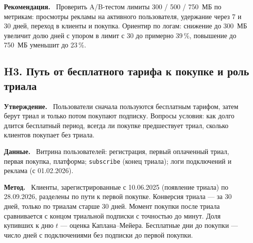 \documentclass[11pt,a4paper]{article}
\newcommand{\hblock}[1]{\par\smallskip\noindent\textbf{#1.}~}
\begin{document}
\hblock{Рекомендация} Проверить A/B-тестом лимиты 300 / 500 / 750~МБ по метрикам: просмотры рекламы на активного пользователя, удержание через 7 и 30 дней, переход в клиенты и покупка. Ориентир по логам: снижение до 300~МБ увеличит долю дней с упором в лимит с 30 до примерно 39\,\%, повышение до 750~МБ уменьшит до 23\,\%.

\subsection{H3. Путь от бесплатного тарифа к покупке и роль триала}

\hblock{Утверждение} Пользователи сначала пользуются бесплатным тарифом, затем берут триал и только потом покупают подписку. Вопросы условия: как долго длится бесплатный период, всегда ли покупке предшествует триал, сколько клиентов покупает без триала.

\hblock{Данные} Витрина пользователей: регистрация, первый оплаченный триал, первая покупка, платформа; \texttt{subscribe} (конец триала); логи подключений и реклама (с 01.02.2026).

\hblock{Метод} Клиенты, зарегистрированные с 10.06.2025 (появление триала) по 28.09.2026, разделены по пути к первой покупке. Конверсия триала --- за 30 дней, только по триалам старше 30 дней. Момент покупки после триала сравнивается с концом триальной подписки с точностью до минут. Доля купивших к дню $t$ --- оценка Каплана--Мейера. Бесплатные дни до покупки --- число дней с подключениями без подписки до первой покупки.
\end{document}
